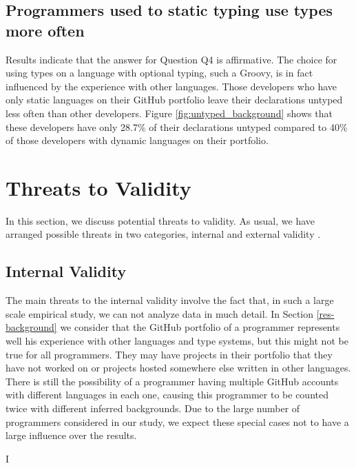 \documentclass[preprint]{sigplanconf}
\begin{document}
\subsection{Programmers used to static typing use types more often\label{discussion-q4}}
Results indicate that the answer for Question Q4 is affirmative.
The choice for using types on a language with optional typing, such a Groovy, is in fact influenced by the experience  with other languages.
Those developers who have only static languages on their GitHub portfolio leave their declarations untyped less often than other developers.
Figure \ref{fig:untyped_background} shows that these developers have only 28.7\% of their declarations untyped compared to 40\% of those developers with dynamic languages on their portfolio. 











%
%
\section{Threats to Validity\label{threats}}
In this section, we discuss potential threats to validity. As usual, we have arranged possible threats in two categories, internal and external validity \cite{Wohlin2012}. 

\subsection*{Internal Validity}
The main threats to the internal validity involve the fact that, in such a large scale empirical study, we can not analyze data in much detail. 
In Section \ref{res-background} we consider that the GitHub portfolio of a programmer represents well his experience with other languages and type systems, but this might not be true for all programmers.
They may have projects in their portfolio that they have not worked on or projects hosted somewhere else written in other languages.
There is still the possibility of a programmer having multiple GitHub accounts with different languages in each one, causing this programmer to be counted twice with different inferred backgrounds.
Due to the large number of programmers considered in our study, we expect these special cases not to have a large influence over the results.

I%
\end{document}

